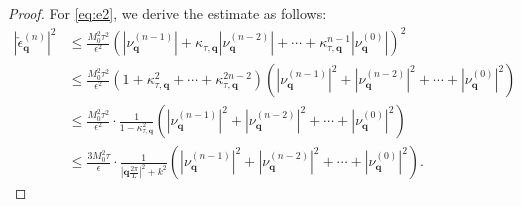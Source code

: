 \documentclass[review,onefignum,onetabnum]{siamart250211}
\begin{document}
\begin{proof}
For \eqref{eq:e2}, we derive the estimate as follows:
\begin{equation}
\begin{aligned}
|\check{\epsilon}_{\mathbf{q}}^{(n)}|^2 &\leq \frac{M_0^2 \tau^2}{\epsilon^2} \left( \left|\nu_{\mathbf{q}}^{(n-1)}\right| + \kappa_{\tau,\mathbf q} \left|\nu_{\mathbf{q}}^{(n-2)}\right| + \cdots + \kappa_{\tau,\mathbf q}^{n-1} \left|\nu_{\mathbf{q}}^{(0)}\right| \right)^2\\
&\leq \frac{M_0^2 \tau^2}{\epsilon^2} \left(1 + \kappa_{\tau,\mathbf q} ^2 + \cdots + \kappa_{\tau,\mathbf q}^{2n-2} \right)\left(\left|\nu_{\mathbf{q}}^{(n-1)}\right|^2 + \left|\nu_{\mathbf{q}}^{(n-2)}\right|^2 + \cdots +  \left|\nu_{\mathbf{q}}^{(0)}\right|^2 \right)\\
&\leq \frac{M_0^2 \tau^2}{\epsilon^2} \cdot \frac{1}{1-\kappa_{\tau,\mathbf q} ^2}\left(\left|\nu_{\mathbf{q}}^{(n-1)}\right|^2 + \left|\nu_{\mathbf{q}}^{(n-2)}\right|^2 + \cdots +  \left|\nu_{\mathbf{q}}^{(0)}\right|^2 \right)\\
&\leq \frac{3M_0^2 \tau}{\epsilon} \cdot \frac{1}{|\mathbf{q}\frac{2\pi}{L}|^2 + k^2}\left(\left|\nu_{\mathbf{q}}^{(n-1)}\right|^2 + \left|\nu_{\mathbf{q}}^{(n-2)}\right|^2 + \cdots +  \left|\nu_{\mathbf{q}}^{(0)}\right|^2 \right).
\end{aligned}
\end{equation}


\end{proof}
\end{document}
